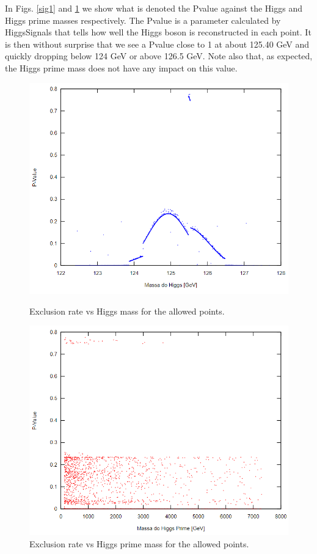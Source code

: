 \documentclass[12pt]{article}
\begin{document}
In Figs. \ref{sig1} and \ref{sig2} we show what is denoted the Pvalue against the Higgs and Higgs prime masses respectively. The Pvalue is a parameter calculated by HiggsSignals that tells how well the Higgs boson is reconstructed in each point. It is then without surprise that we see a Pvalue close to 1 at about 125.40 GeV and quickly dropping below 124 GeV or above 126.5 GeV. Note also that, as expected, the Higgs prime mass does not have any impact on this value.

\begin{figure}[H]
  \includegraphics[width=\linewidth]{Pvalh1.png}
  \caption{Exclusion rate vs Higgs mass for the allowed points.}\label{sig1}
\endminipage\hfill
{}%
  \includegraphics[width=\linewidth]{Pvalh2.png}
  \caption{Exclusion rate vs Higgs prime mass for the allowed points.}\label{sig2}
\endminipage
\end{figure}
\end{document}
